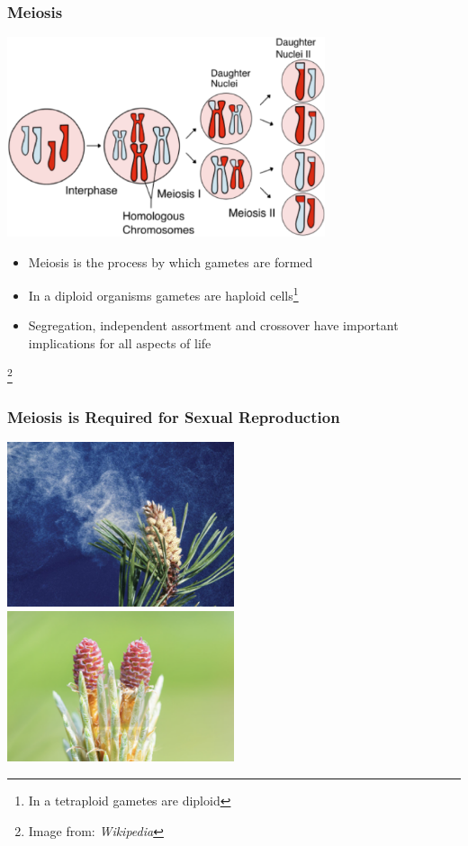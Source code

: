 \documentclass{beamer}
\newcommand\blfootnote[1]{%
	\begingroup
	\renewcommand\thefootnote{}\footnote{#1}%
	\addtocounter{footnote}{-1}%
	\endgroup
}
\begin{document}
	
	\begin{frame}
		\frametitle{Meiosis}
		\centering \includegraphics[keepaspectratio, width  =0.7\textwidth]{img/meiosis}  \\
		\begin{itemize}
			
			\item[] Meiosis is the process by which gametes are formed
			\item[] In a diploid organisms gametes are haploid cells\footnote[1]{In a tetraploid gametes are diploid}
			\item[] Segregation, independent assortment and crossover have important implications for all aspects of life 
			
		\end{itemize}
		\blfootnote{Image from: \textit{Wikipedia}}
	\end{frame}
	
	
	\begin{frame}
		\frametitle{Meiosis is Required for Sexual Reproduction}
				\centering \includegraphics[keepaspectratio, width  =0.5\textwidth]{img/pollenCone}  \includegraphics[keepaspectratio, width  =0.5\textwidth]{img/seedCone} \\
		\end{frame}
	
\end{document}
